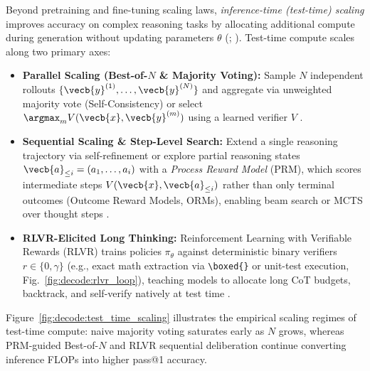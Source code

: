 \documentclass[../../../../master.tex]{subfiles}
\begin{document}
\begin{sloppypar}
Beyond pretraining and fine-tuning scaling laws, \emph{inference-time (test-time) scaling} improves accuracy on complex reasoning tasks by allocating additional compute during generation without updating parameters $\theta$ (; ). Test-time compute scales along two primary axes:
\end{sloppypar}
\begin{itemize}
  \item \textbf{Parallel Scaling (Best-of-$N$ \& Majority Voting):} Sample $N$ independent rollouts $\{\vecb{y}^{(1)}, \dots, \vecb{y}^{(N)}\}$ and aggregate via unweighted majority vote (Self-Consistency) or select $\argmax_{m} V(\vecb{x}, \vecb{y}^{(m)})$ using a learned verifier $V$ .
  \item \textbf{Sequential Scaling \& Step-Level Search:} Extend a single reasoning trajectory via self-refinement or explore partial reasoning states $\vecb{a}_{\le i} = (a_1, \dots, a_i)$ with a \emph{Process Reward Model} (PRM), which scores intermediate steps $V(\vecb{x}, \vecb{a}_{\le i})$ rather than only terminal outcomes (Outcome Reward Models, ORMs), enabling beam search or MCTS over thought steps .
  \item \textbf{RLVR-Elicited Long Thinking:} Reinforcement Learning with Verifiable Rewards (RLVR) trains policies $\pi_{\theta}$ against deterministic binary verifiers $r \in \{0, \gamma\}$ (e.g., exact math extraction via \verb|\boxed{}| or unit-test execution, Fig.~\ref{fig:decode:rlvr_loop}), teaching models to allocate long CoT budgets, backtrack, and self-verify natively at test time .
\end{itemize}


Figure~\ref{fig:decode:test_time_scaling} illustrates the empirical scaling regimes of test-time compute: naive majority voting saturates early as $N$ grows, whereas PRM-guided Best-of-$N$ and RLVR sequential deliberation continue converting inference FLOPs into higher pass@1 accuracy.
\end{document}
